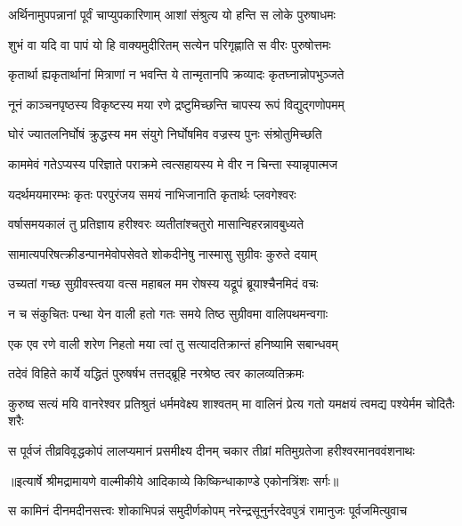 \twolineshloka
{अर्थिनामुपपन्नानां पूर्वं चाप्युपकारिणाम्}
{आशां संश्रुत्य यो हन्ति स लोके पुरुषाधमः} %

\twolineshloka
{शुभं वा यदि वा पापं यो हि वाक्यमुदीरितम्}
{सत्येन परिगृह्णाति स वीरः पुरुषोत्तमः} %

\twolineshloka
{कृतार्था ह्यकृतार्थानां मित्राणां न भवन्ति ये}
{तान्मृतानपि क्रव्यादः कृतघ्नान्नोपभुञ्जते} %

\twolineshloka
{नूनं काञ्चनपृष्ठस्य विकृष्टस्य मया रणे}
{द्रष्टुमिच्छन्ति चापस्य रूपं विद्युद्गणोपमम्} %

\twolineshloka
{घोरं ज्यातलनिर्घोषं क्रुद्धस्य मम संयुगे}
{निर्घोषमिव वज्रस्य पुनः संश्रोतुमिच्छति} %

\twolineshloka
{काममेवं गतेऽप्यस्य परिज्ञाते पराक्रमे}
{त्वत्सहायस्य मे वीर न चिन्ता स्यान्नृपात्मज} %

\twolineshloka
{यदर्थमयमारम्भः कृतः परपुरंजय}
{समयं नाभिजानाति कृतार्थः प्लवगेश्वरः} %

\twolineshloka
{वर्षासमयकालं तु प्रतिज्ञाय हरीश्वरः}
{व्यतीतांश्चतुरो मासान्विहरन्नावबुध्यते} %

\twolineshloka
{सामात्यपरिषत्क्रीडन्पानमेवोपसेवते}
{शोकदीनेषु नास्मासु सुग्रीवः कुरुते दयाम्} %

\twolineshloka
{उच्यतां गच्छ सुग्रीवस्त्वया वत्स महाबल}
{मम रोषस्य यद्रूपं ब्रूयाश्चैनमिदं वचः} %

\twolineshloka
{न च संकुचितः पन्था येन वाली हतो गतः}
{समये तिष्ठ सुग्रीवमा वालिपथमन्वगाः} %

\twolineshloka
{एक एव रणे वाली शरेण निहतो मया}
{त्वां तु सत्यादतिक्रान्तं हनिष्यामि सबान्धवम्} %

\twolineshloka
{तदेवं विहिते कार्ये यद्धितं पुरुषर्षभ}
{तत्तद्ब्रूहि नरश्रेष्ठ त्वर कालव्यतिक्रमः} %

\fourlineindentedshloka
{कुरुष्व सत्यं मयि वानरेश्वर}
{ प्रतिश्रुतं धर्ममवेक्ष्य शाश्वतम्}
{मा वालिनं प्रेत्य गतो यमक्षयं}
{ त्वमद्य पश्येर्मम चोदितैः शरैः} %

\fourlineindentedshloka
{स पूर्वजं तीव्रविवृद्धकोपं}
{ लालप्यमानं प्रसमीक्ष्य दीनम्}
{चकार तीव्रां मतिमुग्रतेजा}
{ हरीश्वरमानववंशनाथः} %


{॥इत्यार्षे श्रीमद्रामायणे वाल्मीकीये आदिकाव्ये किष्किन्धाकाण्डे एकोनत्रिंशः सर्गः॥}


\fourlineindentedshloka
{स कामिनं दीनमदीनसत्त्वः}
{ शोकाभिपन्नं समुदीर्णकोपम्}
{नरेन्द्रसूनुर्नरदेवपुत्रं}
{ रामानुजः पूर्वजमित्युवाच} %

